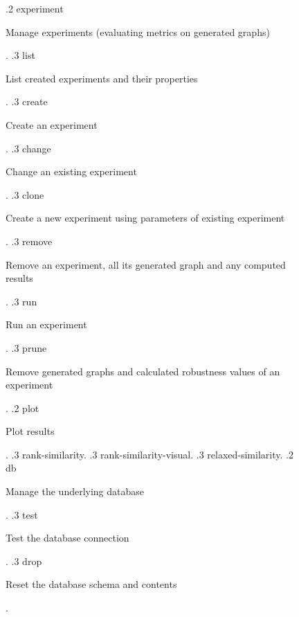 \begin{figure}
\begin{flushleft}
{.2 experiment \scriptsize \dotfill\ \begin{minipage}[t]{10.6cm}Manage experiments (evaluating metrics on generated graphs)\end{minipage}.
.3 list \scriptsize \dotfill\ \begin{minipage}[t]{10.6cm}List created experiments and their properties\end{minipage}.
.3 create \scriptsize \dotfill\ \begin{minipage}[t]{10.6cm}Create an experiment\end{minipage}.
.3 change \scriptsize \dotfill\ \begin{minipage}[t]{10.6cm}Change an existing experiment\end{minipage}.
.3 clone \scriptsize \dotfill\ \begin{minipage}[t]{10.6cm}Create a new experiment using parameters of existing experiment\end{minipage}.
.3 remove \scriptsize \dotfill\ \begin{minipage}[t]{10.6cm}Remove an experiment, all its generated graph and any computed results\end{minipage}.
.3 run \scriptsize \dotfill\ \begin{minipage}[t]{10.6cm}Run an experiment\end{minipage}.
.3 prune \scriptsize \dotfill\ \begin{minipage}[t]{10.6cm}Remove generated graphs and calculated robustness values of an experiment\end{minipage}.
.2 plot \scriptsize \dotfill\ \begin{minipage}[t]{10.6cm}Plot results\end{minipage}.
.3 rank-similarity.
.3 rank-similarity-visual.
.3 relaxed-similarity.
.2 db \scriptsize \dotfill\ \begin{minipage}[t]{10.6cm}Manage the underlying database\end{minipage}.
.3 test \scriptsize \dotfill\ \begin{minipage}[t]{10.6cm}Test the database connection\end{minipage}.
.3 drop \scriptsize \dotfill\ \begin{minipage}[t]{10.6cm}Reset the database schema and contents\end{minipage}.
}
\end{flushleft}
\end{figure}
